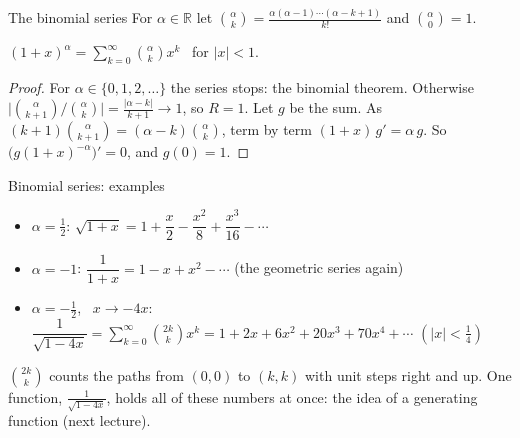 \documentclass[10pt]{wosm-slides}
\newcommand{\R}{\mathbb{R}}
\begin{document}
\begin{frame}{The binomial series}
  For $\alpha \in \R$ let
  $\binom{\alpha}{k} = \frac{\alpha (\alpha - 1) \cdots (\alpha - k + 1)}{k!}$ and $\binom{\alpha}{0} = 1$.
  \begin{theorem}
    $\displaystyle (1 + x)^\alpha = \sum_{k=0}^\infty \binom{\alpha}{k} x^k$ \ for $|x| < 1$.
  \end{theorem}
  \pause
  \begin{proof}
    For $\alpha \in \{0, 1, 2, \dots\}$ the series stops: the binomial theorem. Otherwise
    $\bigl|\binom{\alpha}{k+1} / \binom{\alpha}{k}\bigr| = \frac{|\alpha - k|}{k+1} \to 1$, so $R = 1$.
    Let $g$ be the sum. As $(k+1)\binom{\alpha}{k+1} = (\alpha - k)\binom{\alpha}{k}$, term by term
    $(1 + x)\, g' = \alpha\, g$. So $\bigl(g (1+x)^{-\alpha}\bigr)' = 0$, and $g(0) = 1$.
  \end{proof}
\end{frame}

\begin{frame}{Binomial series: examples}
  \begin{itemize}
    \item $\alpha = \frac12$: \quad
      $\sqrt{1 + x} = 1 + \dfrac{x}{2} - \dfrac{x^2}{8} + \dfrac{x^3}{16} - \cdots$
    \item $\alpha = -1$: \quad
      $\dfrac{1}{1 + x} = 1 - x + x^2 - \cdots$ \quad (the geometric series again)
    \item $\alpha = -\frac12$, \ $x \to -4x$: \quad
      $\dfrac{1}{\sqrt{1 - 4x}} = \sum_{k=0}^\infty \binom{2k}{k} x^k
       = 1 + 2x + 6x^2 + 20x^3 + 70x^4 + \cdots$ \quad $(|x| < \frac14)$
  \end{itemize}
  \pause
  \begin{remark}
    $\binom{2k}{k}$ counts the paths from $(0, 0)$ to $(k, k)$ with unit steps right and up.
    One function, $\frac{1}{\sqrt{1 - 4x}}$, holds all of these numbers at once: the idea of a
    generating function (next lecture).
  \end{remark}
\end{frame}
\end{document}
